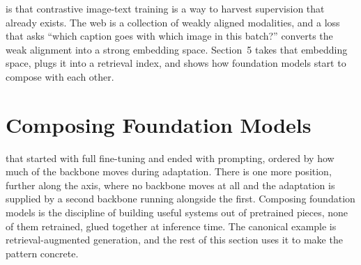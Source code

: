 
 is that contrastive image-text training is a way to harvest supervision that already exists. The web is a collection of weakly aligned modalities, and a loss that asks ``which caption goes with which image in this batch?'' converts the weak alignment into a strong embedding space. Section~5 takes that embedding space, plugs it into a retrieval index, and shows how foundation models start to compose with each other.

\vspace{2.5em}





\newpage
\section{Composing Foundation Models}


 that started with full fine-tuning and ended with prompting, ordered by how much of the backbone moves during adaptation. There is one more position, further along the axis, where no backbone moves at all and the adaptation is supplied by a second backbone running alongside the first. Composing foundation models is the discipline of building useful systems out of pretrained pieces, none of them retrained, glued together at inference time. The canonical example is retrieval-augmented generation, and the rest of this section uses it to make the pattern concrete.

